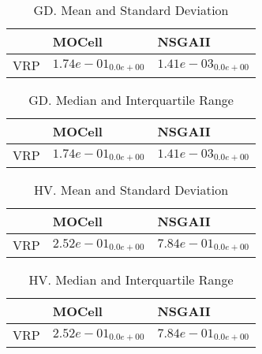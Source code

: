 \documentclass{article}
\begin{document}
\begin{table}
\caption{GD. Mean and Standard Deviation}
\label{table: GD}
\centering
\begin{scriptsize}
\begin{tabular}{lll}
\hline & MOCell &  NSGAII\\
\hline 
VRP & \cellcolor{gray25}$  1.74e-01_{ 0.0e+00}$ & \cellcolor{gray95}$  1.41e-03_{ 0.0e+00}$ \\
\hline
\end{tabular}
\end{scriptsize}
\end{table}

\begin{table}
\caption{GD. Median and Interquartile Range}
\label{table: GD}
\centering
\begin{scriptsize}
\begin{tabular}{lll}
\hline & MOCell &  NSGAII\\
\hline 
VRP & \cellcolor{gray25}$  1.74e-01_{ 0.0e+00}$ & \cellcolor{gray95}$  1.41e-03_{ 0.0e+00}$ \\
\hline
\end{tabular}
\end{scriptsize}
\end{table}

\begin{table}
\caption{HV. Mean and Standard Deviation}
\label{table: HV}
\centering
\begin{scriptsize}
\begin{tabular}{lll}
\hline & MOCell &  NSGAII\\
\hline 
VRP & \cellcolor{gray25}$  2.52e-01_{ 0.0e+00}$ & \cellcolor{gray95}$  7.84e-01_{ 0.0e+00}$ \\
\hline
\end{tabular}
\end{scriptsize}
\end{table}

\begin{table}
\caption{HV. Median and Interquartile Range}
\label{table: HV}
\centering
\begin{scriptsize}
\begin{tabular}{lll}
\hline & MOCell &  NSGAII\\
\hline 
VRP & \cellcolor{gray25}$  2.52e-01_{ 0.0e+00}$ & \cellcolor{gray95}$  7.84e-01_{ 0.0e+00}$ \\
\hline
\end{tabular}
\end{scriptsize}
\end{table}
\end{document}
